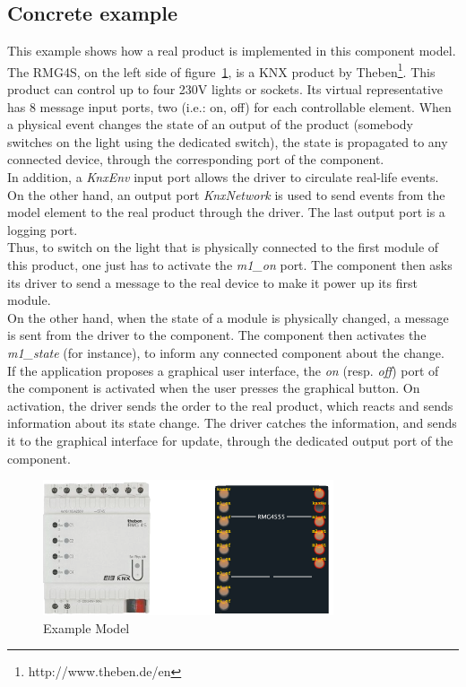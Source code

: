 \subsection{Concrete example}
\label{subsec:compoModConcreteExample}
This example shows how a real product is implemented in this component model. The RMG4S, on the left side of figure~\ref{fig:rmg4s}, is a KNX product by Theben\footnote{http://www.theben.de/en}. This product can control up to four 230V lights or sockets. Its virtual representative has 8 message input ports, two (i.e.: on, off) for each controllable element. When a physical event changes the state of an output of the product (somebody switches on the light using the dedicated switch), the state is propagated to any connected device, through the corresponding port of the component.\\
In addition, a {\it KnxEnv} input port allows the driver to circulate real-life events. On the other hand, an output port {\it KnxNetwork} is used to send events from the model element to the real product through the driver. The last output port is a logging port.\\
Thus, to switch on the light that is physically connected to the first module of this product, one just has to activate the {\it m1\_on} port. The component then asks its driver to send a message to the real device to make it power up its first module.\\
On the other hand, when the state of a module is physically changed, a message is sent from the driver to the component. The component then activates the {\it m1\_state} (for instance), to inform any connected component about the change.\\
If the application proposes a graphical user interface, the {\it on} (resp. {\it off}) port of the component is activated when the user presses the graphical button. On activation, the driver sends the order to the real product, which reacts and sends information about its state change. The driver catches the information, and sends it to the graphical interface for update, through the dedicated output port of the component.\\ 

\begin{figure}
\centering
\includegraphics[width=.7\textwidth]{part2/pics/RMG4sModel}
\caption{Example Model}
\label{fig:rmg4s}
\end{figure}


